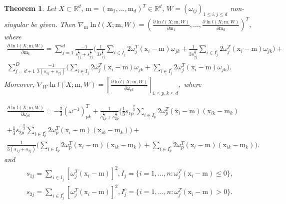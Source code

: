 \documentclass[12pt]{article}
\def\R{\mathbb{R}}
\def\w{\omega}
\def\x{\mathrm{x}}
\def\m{\mathrm{m}}
\newtheorem{theorem}{Theorem}[section]
\theoremstyle{definition}
\begin{document}
\begin{theorem}\label{therII:grad}
Let $X \subset \R^d$, $\m = (\m_1, \ldots, \m_d)^T \in \R^d$, $W = (\w_{ij})_{1 \leq i,j \leq d}$ non-singular be given. 
Then
$\nabla_{\m}  \ln {l}(X;\m,W) = \left(  \frac{\partial \ln {l}(X;\m,W)}{\partial \m_1}, \ldots, \frac{\partial \ln {l}(X;\m,W)}{\partial \m_d} \right)^T$,
where
$$
\begin{array}{l}
\frac{\partial \ln {l(X;\m,W)}}{\partial \m_k} =\sum\limits_{j=1}^d \frac{-1}{{s}_{1j}^{\frac{1}{3}} + {s}_{2j}^{\frac{1}{3}}} \bigg(
\frac{1}{3 {s}_{1j}^{\frac{2}{3}}} \sum\limits_{i \in I_j} 2 \w_j^T (\x_i - \m)  \w_{jk} +%
\frac{1}{3 {s}_{2j}^{\frac{2}{3}}} \sum\limits_{i \in I_j^c} 2 \w_j^T (\x_i - \m) \w_{jk}
\bigg)+\\[6pt]
\sum\limits_{j=d+1}^D \frac{-1}{3(s_{1j}+s_{2j})} \bigg(
 \sum\limits_{i \in I_j} 2 \w_j^T (\x_i - \m)  \w_{jk} +%
 \sum\limits_{i \in I_j^c} 2 \w_j^T (\x_i - \m) \w_{jk}
\bigg)
.
\end{array}
$$
Moreover,
$
\nabla_{W} \ln {l}(X;\m,W) = \left[ \frac{\partial \ln \tilde{l}(X;\m,W)}{\partial \w_{pk}}  \right]_{1 \leq p,k \leq d},
$
where

$$
\begin{array}{l}
\frac{\partial \ln {l(X;\m,W)}}{\partial \w_{pk}} = -\frac{2}{3} (\w^{-1})^T_{pk} + \frac{1}{{s}_{1p}^{\frac{1}{3}} +{s}_{2p}^{\frac{1}{3}}} 
 \bigg(
\frac{1}{3} {s}_{1p}^{-\frac{2}{3}} \sum\limits_{ i \in {I}_p} 2 \w^T_p (\x_i - \m) (\x_{ik} - \m_k)\\[6pt]
+ \frac{1}{3} {s}_{2p}^{-\frac{2}{3}} \sum\limits_{ i \in {I}_p^c} 2 \w^T_p (\x_i - \m) (\x_{ik} - \m_k) \bigg)+\\[6pt]

\frac{1}{ 3(s_{1j}+s_{2j}) } 
 \bigg(
\sum\limits_{ i \in {I}_p} 2 \w^T_p (\x_i - \m) (\x_{ik} - \m_k) + \sum\limits_{ i \in {I}_p^c} 2 \w^T_p (\x_i - \m) (\x_{ik} - \m_k) \bigg)
.
\end{array}
$$
and
$$
\begin{array}{c}
{s}_{1j}= \! \sum\limits_{i \in I_j}[ \w_{j}^T (\x_i-\m)]^2, {I}_j=\{ i = 1,\ldots,n \colon \w_{j}^T (\x_i-\m) \leq 0 \},
\\[1ex]
{s}_{2j}= \! \sum\limits_{i \in I_j^c}[ \w_{j}^T (\x_i-\m)]^2,  {I}_j^c=\{ i = 1,\ldots,n \colon  \w_{j}^T (\x_i-\m) > 0 \}.
\end{array}
$$
\end{theorem}
\end{document}
